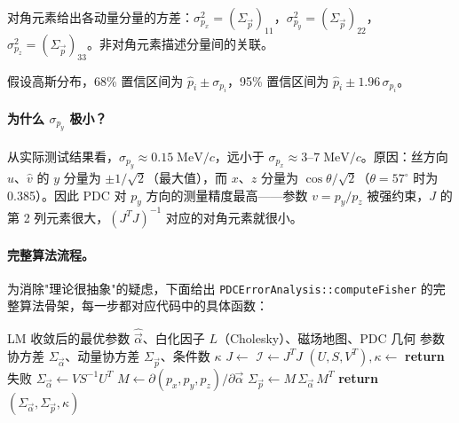 \documentclass[a4paper, 11pt]{article}
\begin{document}
对角元素给出各动量分量的方差：$\sigma_{p_x}^2 = (\Sigma_{\vec{p}})_{11}$，$\sigma_{p_y}^2 = (\Sigma_{\vec{p}})_{22}$，$\sigma_{p_z}^2 = (\Sigma_{\vec{p}})_{33}$。非对角元素描述分量间的关联。

假设高斯分布，68\% 置信区间为 $\hat{p}_i \pm \sigma_{p_i}$，95\% 置信区间为 $\hat{p}_i \pm 1.96\,\sigma_{p_i}$。

\paragraph{为什么 $\sigma_{p_y}$ 极小？}
从实际测试结果看，$\sigma_{p_y} \approx 0.15\;\mathrm{MeV}/c$，远小于 $\sigma_{p_x} \approx 3\text{--}7\;\mathrm{MeV}/c$。原因：丝方向 $\hat{u}$、$\hat{v}$ 的 $y$ 分量为 $\pm 1/\sqrt{2}$（最大值），而 $x$、$z$ 分量为 $\cos\theta/\sqrt{2}$（$\theta = 57^\circ$ 时为 0.385）。因此 PDC 对 $p_y$ 方向的测量精度最高——参数 $v = p_y/p_z$ 被强约束，$J$ 的第 2 列元素很大，$(J^TJ)^{-1}$ 对应的对角元素就很小。

\paragraph{完整算法流程。}
为消除"理论很抽象"的疑虑，下面给出 \texttt{PDCErrorAnalysis::computeFisher} 的完整算法骨架，每一步都对应代码中的具体函数：

\begin{algorithm}[H]
\caption{Fisher 协方差计算（每条 track 调用一次）}
\label{alg:fisher}
\begin{algorithmic}[1]
\Require LM 收敛后的最优参数 $\hat{\vec{\alpha}}$、白化因子 $L$（Cholesky）、磁场地图、PDC 几何
\Ensure 参数协方差 $\Sigma_{\vec{\alpha}}$、动量协方差 $\Sigma_{\vec{p}}$、条件数 $\kappa$
\State $J \gets$  
\State $\mathcal{I} \gets J^T J$ 
\State $(U, S, V^T), \kappa \gets$ 
  \State \textbf{return} 失败 
\EndIf
\State $\Sigma_{\vec{\alpha}} \gets V S^{-1} U^T$
\State $M \gets \partial(p_x, p_y, p_z) / \partial \vec{\alpha}$ 
\State $\Sigma_{\vec{p}} \gets M\, \Sigma_{\vec{\alpha}}\, M^T$
\State \textbf{return} $(\Sigma_{\vec{\alpha}}, \Sigma_{\vec{p}}, \kappa)$
\end{algorithmic}
\end{algorithm}
\end{document}
